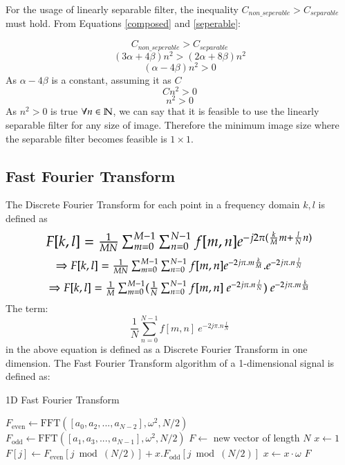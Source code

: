 \documentclass[a4paper,11pt]{article}
\begin{document}
For the usage of linearly separable filter, the inequality $C_{non\_seperable} > C_{separable}$ must hold. From Equations \eqref{composed} and \eqref{seperable}:

\[
C_{non\_seperable} > C_{separable}
\]
\[
(3 \alpha+4\beta)n^2 > (2 \alpha + 8 \beta) n^2
\]
\[
(\alpha-4\beta)n^2>0
\]
\newline
As $\alpha - 4\beta$ is a constant, assuming it as $C$
\[
Cn^2>0
\]
\[
n^2>0
\]
\newline
As $n^2>0$ is true $\forall \space n \in \mathbb{N}$, we can say that it is feasible to use the linearly separable filter for any size of image. Therefore the minimum image size where the separable filter becomes feasible is $1 \times 1$.
\subsection{Fast Fourier Transform}
The Discrete Fourier Transform for each point in a frequency domain $k,l$ is defined as
\[
\scalebox{1.5}{$F[k,l] = \frac{1}{MN} \sum_{m=0}^{M-1}\sum_{n=0}^{N-1} f[m,n]e^{-j2\pi(\frac{k}  {M}m + \frac{l}{N}n)}$} 
\]
\newline
\[
\scalebox{1.2}{$ \Rightarrow F[k,l] = \frac{1}{MN} \sum_{m=0}^{M-1} \sum_{n=0}^{N-1}f[m,n]e^{-2j\pi.m\frac{k}{M}}.e^{-2j\pi.n\frac{l}{N}} $} 
\]
\newline
\[
\scalebox{1.2}{$
\Rightarrow F[k,l] = \frac{1}{M}\sum_{m=0}^{M-1}(\frac{1}{N}\sum_{n=0}^{N-1}f[m,n]\ e^{-2j\pi.n\frac{l}{N}})\ e^{-2j\pi.m\frac{k}{M}}
$}
\]
\newline
The term:
\[
\frac{1}{N}\sum_{n=0}^{N-1}f[m,n]\ e^{-2j\pi.n\frac{l}{N}}
\]
\newline
in the above equation is defined as a Discrete Fourier Transform in one dimension. The Fast Fourier Transform algorithm of a 1-dimensional signal is defined as:
\begin{algorithm}
\caption{1D Fast Fourier Transform}\label{fft}
\begin{algorithmic}[1]
\Function{FFT}{$[a_0,...a_N-1,\omega,N$}
 \Return{$[a_0]$} \EndIf
\State $F_{\text{even}} \gets \text{FFT}([a_0, a_2,..., a_{N-2}], \omega^2, N/2)$
    \State $F_{\text{odd}} \gets \text{FFT}([a_1, a_3,..., a_{N-1}], \omega^2, N/2)$
    \State $F \gets$ new vector of length $N$
    \State $x \gets 1$
        \State $F[j] \gets F_{\text{even}}[j \bmod (N/2)] + x.F_{\text{odd}}[j \bmod (N/2)]$
        \State $x \gets x \cdot \omega$
    \EndFor
    \State \Return $F$
\EndFunction
\end{algorithmic}
\end{algorithm}
\end{document}
